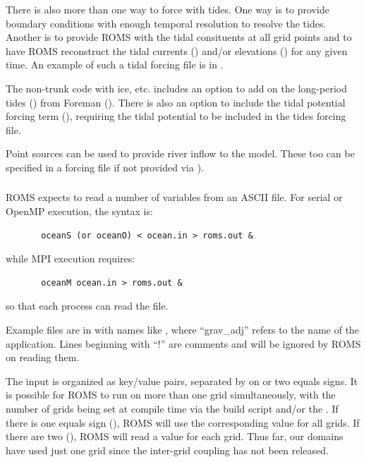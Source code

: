 \smallskip
{}

There is also more than one way to force with tides. One way is to
provide boundary conditions with enough temporal resolution to
resolve the tides. Another is to provide ROMS with the tidal
consituents at all grid points and to have ROMS reconstruct the
tidal currents ()  and/or elevations ()
for any given time. An example of such a tidal forcing file is in
.

The non-trunk code with ice, etc. includes an option to
add on the long-period tides () from Foreman
(\cite{??}). There is also an option to include the tidal potential
forcing term (), requiring the tidal potential to
be included in the tides forcing file.

\smallskip
{}

Point sources can be used to provide river inflow to the model.
These too can be specified in a forcing file if not provided via
).

\subsubsection{}
ROMS expects to read a number of variables from an ASCII file.
For serial or OpenMP execution, the syntax is:
\begin{verbatim}
       oceanS (or oceanO) < ocean.in > roms.out &
\end{verbatim}
while MPI execution requires:
\begin{verbatim}
       oceanM ocean.in > roms.out &
\end{verbatim}
so that each process can read the file.

Example files are in  with names like
, where ``grav\_adj'' refers to the name of
the application. Lines beginning with ``!'' are comments and will be
ignored by ROMS on reading them.

The input is organized as key/value pairs, separated by on or two
equals signs. It is possible for ROMS to run on more than one grid
simultaneously, with the number of grids being set at compile time
via the build script and/or the . If there is one
equals sign (\code{=}), ROMS will use the corresponding value for
all grids. If there are two (\code{==}), ROMS will read a value for
each grid. Thus far, our domains have used just one grid since the
inter-grid coupling has not been released.

